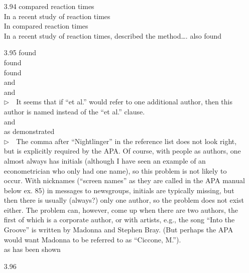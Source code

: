 \documentclass{article}
\newcommand{\EM}{\ensuremath{\triangleright\quad}}
\begin{document}
\begin{itemize}
\item[3.94]   compared reaction times\\
             In a recent study of reaction times \cite{3.94-1}\\
             In  \citeauthor{3.94-1} compared
               reaction times\\
             In a recent study of reaction times, 
             described the method\ldots. \citeauthor{3.94-1} also found
\item[3.95]   found\\
              found\\
             \citeauthor{3.95-1} found\\
              and \\
              and \\
             \EM It seems that if ``et al.'' would refer to one additional
             author, then this author is named instead of the ``et al.''
             clause.\\
              and \\
             as  demonstrated\\
             \EM The comma after ``Nightlinger'' in the reference list
             does not look right, but is explicitly required by the APA.
             Of course, with people as authors,
             one almost always has initials (although I have seen
             an example of an econometrician who only had
             one name), so this problem is not likely to occur.
             With nicknames (``screen names'' as they are called in the
             APA manual below ex. 85) in messages to newsgroups, initials
             are typically missing, but then there is usually (always?)
             only one author, so the problem does not exist either.
             The problem can, however, come up when there are two authors,
             the first of which is a corporate author, or with artists,
             e.g., the song ``Into the Groove'' is written by
             Madonna and Stephen Bray. (But perhaps the APA would want
             Madonna to be referred to as ``Ciccone, M.'').\\
             as has been shown \cite{3.95-7}
\item[3.96]  \cite{3.96-1}\\

\end{itemize}
\end{document}
